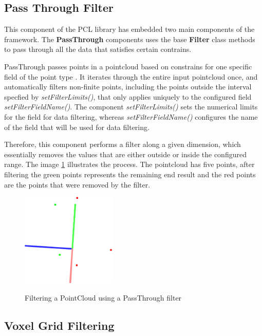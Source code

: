 \documentclass[12pt]{report}
\begin{document}
\subsection{Pass Through Filter}
\label{section:Pass Through Filter}
This component of the PCL library has embedded two main components of the framework. 
The \textbf{PassThrough} components uses the base \textbf{Filter} class methods to pass through all the data that satisfies certain contrains.

PassThrough passes points in a pointcloud based on constrains for one specific field of the point type .
It iterates through the entire input pointcloud once, and automatically filters non-finite points, including the points outside the interval specfied by \textit{setFilterLimits()}, 
that only applies uniquely to the configured field \textit{setFilterFieldName()}. 
The component \textit{setFilterLimits()} sets the numerical limits for the field for data filtering, whereas \textit{setFilterFieldName()} configures the name of the field that will be used for data filtering.

Therefore, this component performs a filter along a given dimension, which essentially removes the values that are either outside or inside the configured range.
The image \ref{fig:pass_through} illustrates the process. The pointcloud has five points, after filtering the green points represents the remaining end result and the red points are the points that were removed by the filter.


\begin{figure}[H]%
  \centering
  \includegraphics[width=0.4\textwidth]{passthrough_2.png}
 \caption{Filtering a PointCloud using a PassThrough filter}\cite[]{Rusu_ICRA2011_PCL}
 \label{fig:pass_through} 
\end{figure}

\subsection{Voxel Grid Filtering}
\label{section:Voxel Grid Filtering}
\end{document}
